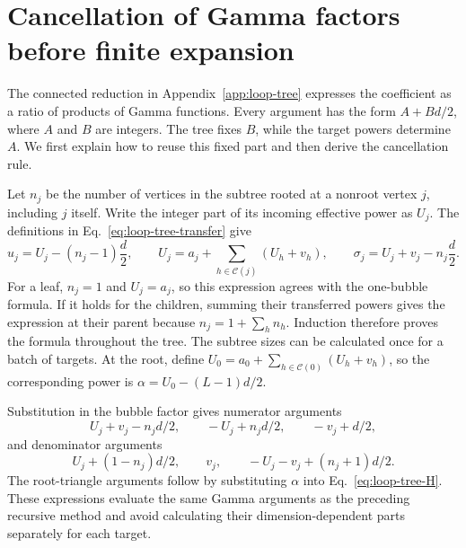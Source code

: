\section{Cancellation of Gamma factors before finite expansion}
\label{app:gamma-cancel}
The connected reduction in Appendix~\ref{app:loop-tree} expresses the coefficient as a ratio of products of Gamma functions. Every argument has the form $A+Bd/2$, where $A$ and $B$ are integers. The tree fixes $B$, while the target powers determine $A$. We first explain how to reuse this fixed part and then derive the cancellation rule.

Let $n_j$ be the number of vertices in the subtree rooted at a nonroot vertex $j$, including $j$ itself. Write the integer part of its incoming effective power as $U_j$. The definitions in Eq.~\eqref{eq:loop-tree-transfer} give
\begin{equation}
 u_j=U_j-(n_j-1)\frac d2,
 \qquad U_j=a_j+\sum_{h\in\mathcal C(j)}(U_h+v_h),
 \qquad \sigma_j=U_j+v_j-n_j\frac d2.
 \label{eq:gamma-cancel-subtree}
\end{equation}
For a leaf, $n_j=1$ and $U_j=a_j$, so this expression agrees with the one-bubble formula. If it holds for the children, summing their transferred powers gives the expression at their parent because $n_j=1+\sum_h n_h$. Induction therefore proves the formula throughout the tree. The subtree sizes can be calculated once for a batch of targets. At the root, define $U_0=a_0+\sum_{h\in\mathcal C(0)}(U_h+v_h)$, so the corresponding power is $\alpha=U_0-(L-1)d/2$.

Substitution in the bubble factor gives numerator arguments
\begin{equation}
 U_j+v_j-n_jd/2,\qquad -U_j+n_jd/2,\qquad -v_j+d/2,
\end{equation}
and denominator arguments
\begin{equation}
 U_j+(1-n_j)d/2,\qquad v_j,\qquad -U_j-v_j+(n_j+1)d/2.
\end{equation}
The root-triangle arguments follow by substituting $\alpha$ into Eq.~\eqref{eq:loop-tree-H}. These expressions evaluate the same Gamma arguments as the preceding recursive method and avoid calculating their dimension-dependent parts separately for each target.

